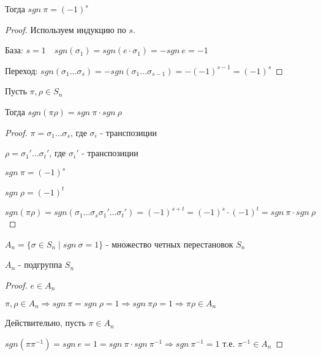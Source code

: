 Тогда $sgn \ \pi = (-1)^s$

\begin{proof}
    Используем индукцию по $s$.

    База: $s = 1 \quad sgn(\sigma_1) = sgn(e \cdot \sigma_1) = -sgn \ e = -1$

    Переход: $sgn(\sigma_1 \dots \sigma_s) = -sgn(\sigma_1 \dots \sigma_{s-1}) = -(-1)^{s-1} = (-1)^s$
\end{proof}

\begin{theorem2}
    Пусть $\pi, \rho \in S_n$

    Тогда $sgn(\pi \rho) = sgn \ \pi \cdot sgn \ \rho$

    \begin{proof} \quad 

        $\pi = \sigma_1 \dots \sigma_s$, где $\sigma_i$ - транспозиции

        $\rho = \sigma_1' \dots \sigma_t'$, где $\sigma_i'$ - транспозиции

        $sgn \ \pi = (-1)^s$

        $sgn \ \rho = (-1)^t$

        $sgn(\pi \rho) = sgn(\sigma_1 \dots \sigma_s \sigma_1' \dots \sigma_t') =
        (-1)^{s+t} = (-1)^s \cdot (-1)^t = sgn \ \pi \cdot sgn \ \rho$
    \end{proof}
\end{theorem2}

\begin{theorem-non}
    $A_n = \{ \sigma \in S_n \mid sgn \ \sigma = 1 \}$ - множество четных перестановок $S_n$

    $A_n$ - подгруппа $S_n$

    \begin{proof}
        $e \in A_n$

        $\pi, \rho \in A_n \Longrightarrow sgn \ \pi = sgn \ \rho = 1 \Longrightarrow sgn \ \pi \rho = 1 
        \Longrightarrow \pi \rho \in A_n$

        Действительно, пусть $\pi \in A_n$

        $sgn(\pi \pi^{-1}) = sgn \ e = 1 = sgn \ \pi \cdot sgn \ \pi^{-1}
        \Longrightarrow sgn \ \pi^{-1} = 1$ т.е. $\pi^{-1} \in A_n$
    \end{proof}
\end{theorem-non}

